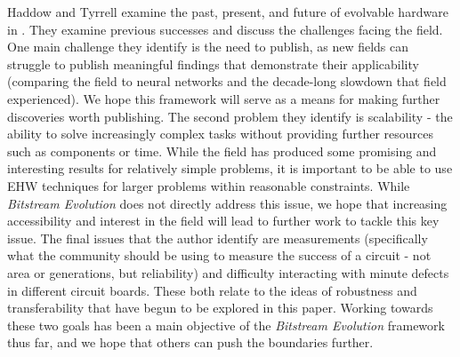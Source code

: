 \documentclass{ieeeaccess}
\newcommand{\highlight}[1]{#1}
\begin{document}
\highlight{
Haddow and Tyrrell examine the past, present, and future of evolvable hardware in \cite{Haddow2018EvolvableFuture}.  They examine previous successes and discuss the challenges facing the field. One main challenge they identify is the need to publish, as new fields can struggle to publish meaningful findings that demonstrate their applicability (comparing the field to neural networks and the decade-long slowdown that field experienced). We hope this framework will serve as a means for making further discoveries worth publishing.
The second problem they identify is scalability - the ability to solve increasingly complex tasks without providing further resources such as components or time. While the field has produced some promising and interesting results for relatively simple problems, it is important to be able to use EHW techniques for larger problems within reasonable constraints. While \textit{Bitstream Evolution} does not directly address this issue, we hope that increasing accessibility and interest in the field will lead to further work to tackle this key issue.
The final issues that the author identify are measurements (specifically what the community should be using to measure the success of a circuit - not area or generations, but reliability) and difficulty interacting with minute defects in different circuit boards. These both relate to the ideas of robustness and transferability that have begun to be explored in this paper. Working towards these two goals has been a main objective of the \textit{Bitstream Evolution} framework thus far, and we hope that others can push the boundaries further.

}
\end{document}
